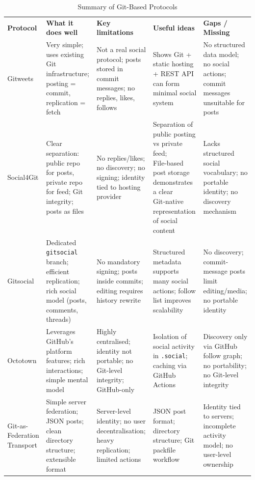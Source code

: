\begin{table}[h]
\centering
\caption{Summary of Git-Based Protocols}
\label{tab:git_summary}
\begin{tabular}{p{2.5cm} p{4cm} p{4cm} p{4cm} p{4cm}}
\textbf{Protocol} &
\textbf{What it does well} &
\textbf{Key limitations} &
\textbf{Useful ideas} &
\textbf{Gaps / Missing} \\

Gitweets &
Very simple; uses existing Git infrastructure; posting = commit, replication = fetch &
Not a real social protocol; posts stored in commit messages; no replies, likes, follows &
Shows Git + static hosting + REST API can form minimal social system &
No structured data model; no social actions; commit messages unsuitable for posts \\

Social4Git &
Clear separation: public repo for posts, private repo for feed; Git integrity; posts as files &
No replies/likes; no discovery; no signing; identity tied to hosting provider &
Separation of public posting vs private feed; File‑based post storage demonstrates a clear Git‑native representation of social content &

Lacks structured social vocabulary; no portable identity; no discovery mechanism \\

Gitsocial &
Dedicated \texttt{gitsocial} branch; efficient replication; rich social model (posts, comments, threads) &
No mandatory signing; posts inside commits; editing requires history rewrite &
Structured metadata supports many social actions; follow list improves scalability &
No discovery; commit-message posts limit editing/media; no portable identity \\

Octotown &
Leverages GitHub’s platform features; rich interactions; simple mental model &
Highly centralised; identity not portable; no Git-level integrity; GitHub-only &
Isolation of social activity in \texttt{.social}; caching via GitHub Actions &
Discovery only via GitHub follow graph; no portability; no Git-level integrity \\

Git-as-Federation Transport &
Simple server federation; JSON posts; clean directory structure; extensible format &
Server-level identity; no user decentralisation; heavy replication; limited actions &
JSON post format; directory structure; Git packfile workflow &
Identity tied to servers; incomplete activity model; no user-level ownership \\
\end{tabular}
\end{table}

